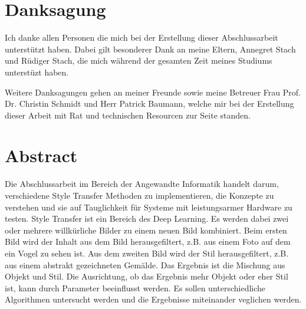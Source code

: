 \chapter*{Danksagung}

Ich danke allen Personen die mich bei der Erstellung dieser Abschlussarbeit unterstützt haben. Dabei gilt besonderer Dank an meine Eltern, Annegret Stach und Rüdiger Stach, die mich während der gesamten Zeit meines Studiums unterstüzt haben.

Weitere Danksagungen gehen an meiner Freunde sowie meine Betreuer Frau Prof. Dr. Christin Schmidt und Herr Patrick Baumann, welche mir bei der Erstellung dieser Arbeit mit Rat und technischen Resourcen zur Seite standen.

\pagebreak

\chapter*{Abstract}


Die Abschlussarbeit im Bereich der Angewandte Informatik handelt darum, verschiedene Style Transfer Methoden zu implementieren, die Konzepte zu verstehen und sie auf Tauglichkeit für Systeme mit leistungsarmer Hardware zu testen. Style Transfer ist ein Bereich des Deep Learning. Es werden dabei zwei oder mehrere willkürliche Bilder zu einem neuen Bild kombiniert. Beim ersten Bild wird der Inhalt aus dem Bild herausgefiltert, z.B. aus einem Foto auf dem ein Vogel zu sehen ist. Aus dem zweiten Bild wird der Stil herausgefiltert, z.B. aus einem abstrakt gezeichneten Gemälde. Das Ergebnis ist die Mischung aus Objekt und Stil. Die Ausrichtung, ob das Ergebnis mehr Objekt oder eher Stil ist, kann durch Parameter beeinflusst werden. Es sollen unterschiedliche Algorithmen untersucht werden und die Ergebnisse miteinander veglichen werden.